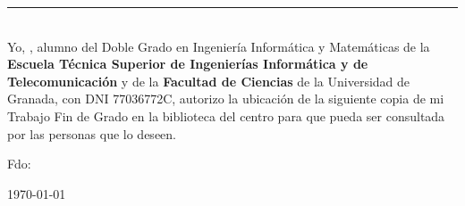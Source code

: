 \thispagestyle{empty}
{}

\hfill
\vfill
\noindent\rule[-1ex]{\textwidth}{2pt}\\[4.5ex]
Yo, \textbf{\miNombre}, alumno del Doble Grado en Ingeniería Informática y Matemáticas de la \textbf{Escuela Técnica Superior de Ingenierías Informática y de Telecomunicación} y de la \textbf{Facultad de Ciencias} de la Universidad de Granada, con DNI 77036772C, autorizo la ubicación de la siguiente copia de mi Trabajo Fin de Grado en la biblioteca del centro para que pueda ser consultada por las personas que lo deseen.

\vfill\vfill\vfill\vfill

\begin{flushleft} 
Fdo: \miNombre 
\end{flushleft}

\bigskip

\begin{flushright} 
\today 
\end{flushright}

\vfill
\newpage
\endinput